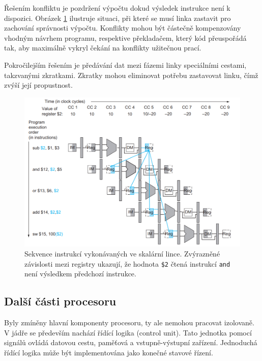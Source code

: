 Řešením konfliktu je pozdržení výpočtu dokud výsledek instrukce není k dispozici.
Obrázek \ref{dataconflictsfrombook} ilustruje situaci, při které se musí linka zastavit pro zachování správnosti výpočtu.
Konflikty mohou být částečně kompenzovány vhodným návrhem programu, respektive překladačem, který kód přeuspořádá tak, aby maximálně vykryl čekání na konflikty užitečnou prací.

Pokročilejším řešením je předávání dat mezi fázemi linky speciálními cestami, takzvanými zkratkami.
Zkratky mohou eliminovat potřebu zastavovat linku, čímž zvýší její propustnost.

\begin{figure}[ht]\centering
  \centering
  \includegraphics[width=15cm]{obrazky-figures/conflicts.png}
  \caption{Sekvence instrukcí vykonávaných ve skalární lince.
  Zvýrazněné závislosti mezi registry ukazují, že hodnota \texttt{\$2} čtená instrukcí \texttt{and} není výsledkem předchozí instrukce. \cite{OrganizationAndDesign}}
  \label{dataconflictsfrombook}
\end{figure}

\subsection{Další části procesoru}

Byly zmíněny hlavní komponenty procesoru, ty ale nemohou pracovat izolovaně.
V jádře se především nachází řídící logika (control unit).
Tato jednotka pomocí signálů ovládá datovou cestu, paměťová a vstupně-výstupní zařízení.
Jednoduchá řídící logika může být implementována jako konečné stavové řízení.
\cite{OrganizationAndDesign}

